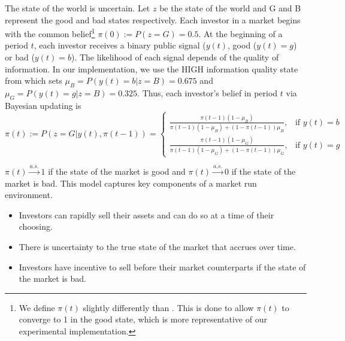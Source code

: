 \documentclass[thesis]{uathesis}
\begin{document}
\begin{body}
The state of the world is uncertain. Let $z$ be the state of the world and G and B represent the good and bad states respectively. Each investor in a market begins with the common belief\footnote{We define $\pi(t)$ slightly differently than \cite{magnani2020dynamic}. This is done to allow $\pi(t)$ to converge to 1 in the good state, which is more representative of our experimental implementation.}  $\pi(0) := P(z = G) = 0.5$. At the beginning of a period $t$, each investor receives a binary public signal ($y(t)$, good ($y(t) = g$) or bad ($y(t) = b$). The likelihood of each signal depends of the quality of information. In our implementation, we use the HIGH information quality state from \cite{magnani2020dynamic} which sets $\mu_B = P(y(t) = b | z = B) = 0.675$ and $\mu_G = P(y(t) = g | z = B) = 0.325$. Thus, each investor's belief in period $t$ via Bayesian updating is
\begin{equation}
    \pi(t) := P(z = G|y(t), \pi(t-1)) =
    \begin{cases}
        \frac{\pi(t-1)(1-\mu_B)}{\pi(t-1)(1-\mu_B) + (1-\pi(t-1))\mu_B}, & \text{if   } y(t) = b \\
        \frac{\pi(t-1)(1-\mu_G)}{\pi(t-1)(1-\mu_G) + (1-\pi(t-1))\mu_G}, & \text{if   } y(t) = g
    \end{cases}
    \label{eq:bayes}
\end{equation}

$\pi(t) \overset{a.s.}{\to} 1$ if the state of the market is good and $\pi(t) \overset{a.s.}{\to} 0 $ if the state of the market is bad.
This model captures key components of a market run environment.
\begin{itemize}
    \item Investors can rapidly sell their assets and can do so at a time of their choosing.
    \item There is uncertainty to the true state of the market that accrues over time.
    \item Investors have incentive to sell before their market counterparts if the state of the market is bad.
\end{itemize}


\end{body}
\end{document}
